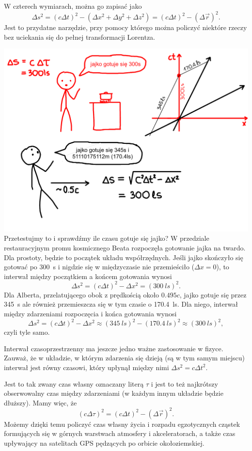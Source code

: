 \documentclass[10pt,twocolumn,fleqn,polish]{article}
\begin{document}
W czterech wymiarach, można go zapisać jako
\[
  \Delta s^2 = (c \Delta t)^2 - (\Delta x^2 + \Delta y^2 + \Delta z^2)
  = (c \Delta t)^2 - (\Delta \vec{r})^2.
\]
Jest to przydatne narzędzie, przy pomocy którego można policzyć niektóre
rzeczy bez uciekania się do pełnej transformacji Lorentza.
\newpage

\noindent\includegraphics[width=1\linewidth]{pages/STA-page31}
Przetestujmy to i sprawdźmy ile czasu gotuje się jajko?
W przedziale restauracyjnym promu kosmicznego Beata rozpoczęła
gotowanie jajka na twardo. Dla prostoty, będzie to początek układu
współrzędnych. Jeśli jajko skończyło się gotować po \SI{300}{\second} i nigdzie
się w międzyczasie nie przemieściło ($\Delta x = 0$), to interwał między początkiem a
końcem gotowania wynosi
\[
  \Delta s^2 = (c\Delta t)^2 - \Delta x^2 = (\SI{300}{ls})^2.
\]
Dla Alberta, przelatującego obok z prędkością około $0.495c$, jajko gotuje się przez
\SI{345}{\second} ale również przemieszcza się w tym czasie o \SI{170.4}{ls}.
Dla niego, interwał między zdarzeniami rozpoczęcia i końca gotowania wynosi
\[
  \Delta s^2 = (c\Delta t)^2 - \Delta x^2 \approx (\SI{345}{ls})^2 - (\SI{170.4}{ls})^2 \approx (\SI{300}{ls})^2,
\]
czyli tyle samo.

Interwał czasoprzestrzenny ma jeszcze jedno ważne zastosowanie w fizyce. Zauważ, że w układzie,
w którym zdarzenia się dzieją (są w tym samym miejscu) interwał jest równy czasowi, który
upłynął między nimi $\Delta s^2 = c\Delta t^2$.

Jest to tak zwany czas własny oznaczany literą $\tau$ i jest to
też najkrótszy obserwowalny czas między zdarzeniami (w każdym innym układzie będzie dłuższy).
Mamy więc, że
\[
  (c\Delta \tau) ^2 = (c\Delta t)^2 - (\Delta \vec{r})^2.
\]
Możemy dzięki temu policzyć czas własny życia i rozpadu egzotycznych cząstek
formujących się w górnych warstwach atmosfery i akceleratorach, a także czas upływający
na satelitach GPS pędzących po orbicie okołoziemskiej.
\end{document}
